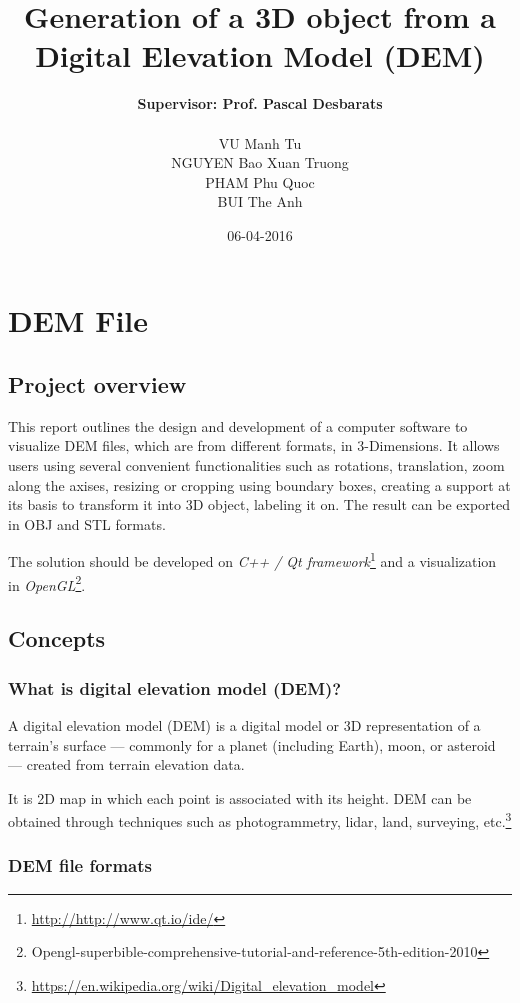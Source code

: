 \documentclass[11pt]{article}
\title{\textbf{Generation of a 3D object from a Digital Elevation Model (DEM)}}
\author{\textbf{Supervisor: Prof. Pascal Desbarats}\\\\
		VU Manh Tu\\
		NGUYEN Bao Xuan Truong\\
		PHAM Phu Quoc\\
		BUI The Anh		
		}
\date{06-04-2016}
\begin{document}
\maketitle
\section{DEM File}
\subsection{Project overview}
This report outlines the design and development of a computer software to visualize DEM files, which are from different formats, in 3-Dimensions. It allows users using several convenient functionalities such as rotations, translation, zoom along the axises, resizing or cropping using boundary boxes, creating a support at its basis to transform it into 3D object, labeling it on. The result can be exported in OBJ and STL formats. 

The solution should be developed on \emph{C++ / Qt framework}\footnote{\url{http://http://www.qt.io/ide/}} and a visualization in \emph{OpenGL}\footnote{Opengl-superbible-comprehensive-tutorial-and-reference-5th-edition-2010}.

\subsection{Concepts}
\subsubsection{What is digital elevation model (DEM)?}
A digital elevation model (DEM) is a digital model or 3D representation of a terrain's surface — commonly for a planet (including Earth), moon, or asteroid — created from terrain elevation data.
\par\noindent It is 2D map in which each point is associated with its height. DEM can be obtained through techniques such as photogrammetry, lidar, land, surveying, etc.\footnote{\url{https://en.wikipedia.org/wiki/Digital_elevation_model}}


\subsubsection{DEM file formats}
\end{document}
